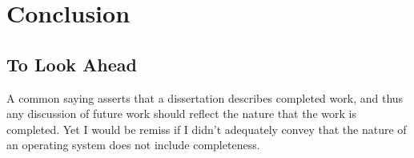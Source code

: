 
\chapter{Conclusion}\label{ch:conclusion}


\section{To Look Ahead}


A common saying asserts that a dissertation describes completed work, and thus any discussion of future work should reflect
the nature that the work is completed. Yet I would be remiss if I didn't adequately convey that the nature of an
operating system does not include completeness.




